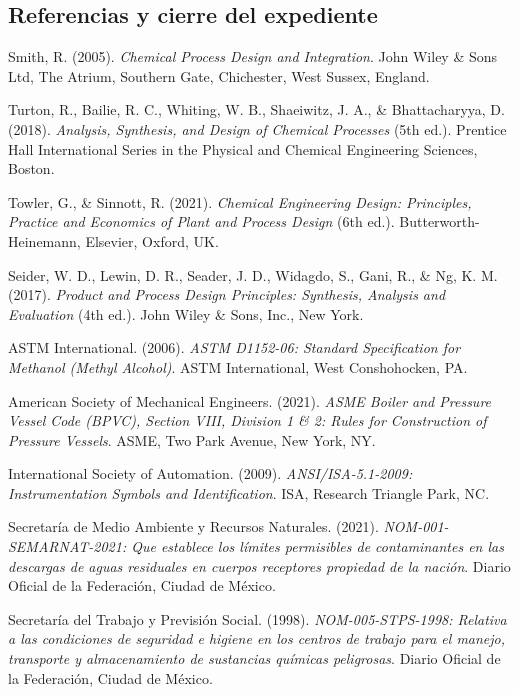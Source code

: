\documentclass[11pt,letterpaper]{article}
\begin{document}
\subsection{Referencias y cierre del expediente}\label{sec:referencias}
\begin{enumerate}[label={[\arabic*]},leftmargin=2em,itemsep=3pt]
  \item Smith, R. (2005). \textit{Chemical Process Design and Integration}. John Wiley \& Sons Ltd, The Atrium, Southern Gate, Chichester, West Sussex, England.
  \item Turton, R., Bailie, R. C., Whiting, W. B., Shaeiwitz, J. A., \& Bhattacharyya, D. (2018). \textit{Analysis, Synthesis, and Design of Chemical Processes} (5th ed.). Prentice Hall International Series in the Physical and Chemical Engineering Sciences, Boston.
  \item Towler, G., \& Sinnott, R. (2021). \textit{Chemical Engineering Design: Principles, Practice and Economics of Plant and Process Design} (6th ed.). Butterworth-Heinemann, Elsevier, Oxford, UK.
  \item Seider, W. D., Lewin, D. R., Seader, J. D., Widagdo, S., Gani, R., \& Ng, K. M. (2017). \textit{Product and Process Design Principles: Synthesis, Analysis and Evaluation} (4th ed.). John Wiley \& Sons, Inc., New York.
  \item ASTM International. (2006). \textit{ASTM D1152-06: Standard Specification for Methanol (Methyl Alcohol)}. ASTM International, West Conshohocken, PA.
  \item American Society of Mechanical Engineers. (2021). \textit{ASME Boiler and Pressure Vessel Code (BPVC), Section VIII, Division 1 \& 2: Rules for Construction of Pressure Vessels}. ASME, Two Park Avenue, New York, NY.
  \item International Society of Automation. (2009). \textit{ANSI/ISA-5.1-2009: Instrumentation Symbols and Identification}. ISA, Research Triangle Park, NC.
  \item Secretaría de Medio Ambiente y Recursos Naturales. (2021). \textit{NOM-001-SEMARNAT-2021: Que establece los límites permisibles de contaminantes en las descargas de aguas residuales en cuerpos receptores propiedad de la nación}. Diario Oficial de la Federación, Ciudad de México.
  \item Secretaría del Trabajo y Previsión Social. (1998). \textit{NOM-005-STPS-1998: Relativa a las condiciones de seguridad e higiene en los centros de trabajo para el manejo, transporte y almacenamiento de sustancias químicas peligrosas}. Diario Oficial de la Federación, Ciudad de México.

\end{enumerate}
\end{document}
